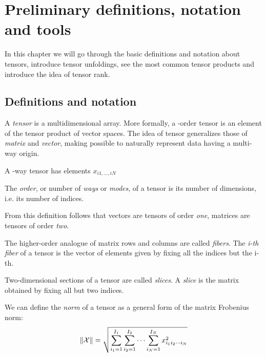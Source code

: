 \chapter{Preliminary definitions, notation and tools}

In this chapter we will go through the basic definitions and notation about tensors, introduce tensor unfoldings, see the most common tensor products and introduce the idea of tensor rank.

\section{Definitions and notation}

A \emph{tensor} is a multidimensional array. More formally, a \N-order tensor is an element of the tensor product of \N vector spaces. The idea of tensor generalizes those of \emph{matrix} and \emph{vector}, making possible to naturally represent data having a multi-way origin.

A \N-way tensor  has elements $x_{i1,\ldots,iN}$

\begin{Def}
  The \emph{order}, or number of \emph{ways} or \emph{modes}, of a tensor is its number of dimensions, i.e. its number of indices.
\end{Def}

From this definition follows that vectors are tensors of order \emph{one}, matrices are tensors of order \emph{two}.

\begin{Def}
  The higher-order analogue of matrix rows and columns are called \emph{fibers}. The \emph{i-th fiber} of a tensor  is the vector of elements given by fixing all the indices but the i-th.
\end{Def}

\begin{Def}
  Two-dimensional sections of a tensor are called \emph{slices}. A \emph{slice} is the matrix obtained by fixing all but two indices.
\end{Def}

\begin{Def}
  We can define the \emph{norm} of a tensor as a general form of the matrix Frobenius norm:
  \[
  \|\mathcal{X}\| = \sqrt{\sum_{i_1 = 1}^{I_1}\sum_{i_2 = 1}^{I_2}\cdots\sum_{i_N = 1}^{I_N}x^2_{i_1 i_2 \cdots i_N}}
  \]
\end{Def}


